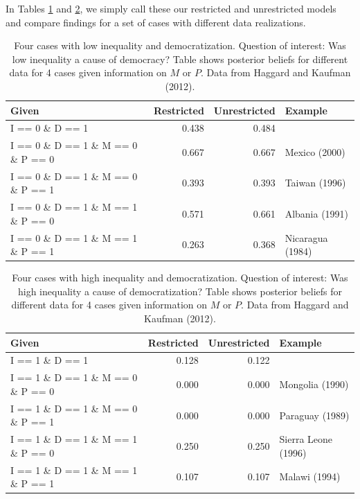 \documentclass[
  12pt,
]{book}
\begin{document}
In Tables \ref{tab:HK8cases1quant} and \ref{tab:HK8cases2quant}, we simply call these our restricted and unrestricted models and compare findings for a set of cases with different data realizations.

\begin{table}

\caption{\label{tab:HK8cases1quant}Four cases with low inequality and  democratization. Question of interest: Was low inequality a cause of democracy? Table shows posterior beliefs for different data for 4 cases given information on $M$ or $P$. Data from Haggard and Kaufman (2012).}
\centering
\begin{tabular}[t]{l|r|r|l}
\hline
Given & Restricted & Unrestricted & Example\\
\hline
I == 0  \& D ==  1 & 0.438 & 0.484 & \\
\hline
I == 0  \& D ==  1 \& M == 0 \& P == 0 & 0.667 & 0.667 & Mexico (2000)\\
\hline
I == 0  \& D ==  1 \& M == 0 \& P == 1 & 0.393 & 0.393 & Taiwan (1996)\\
\hline
I == 0  \& D ==  1 \& M == 1 \& P == 0 & 0.571 & 0.661 & Albania (1991)\\
\hline
I == 0  \& D ==  1 \& M == 1 \& P == 1 & 0.263 & 0.368 & Nicaragua (1984)\\
\hline
\end{tabular}
\end{table}

\begin{table}

\caption{\label{tab:HK8cases2quant}Four cases with high inequality and  democratization. Question of interest: Was high inequality a cause of democratization? Table shows posterior beliefs for different data for 4 cases given information on $M$ or $P$. Data from Haggard and Kaufman (2012).}
\centering
\begin{tabular}[t]{l|r|r|l}
\hline
Given & Restricted & Unrestricted & Example\\
\hline
I == 1  \& D ==  1 & 0.128 & 0.122 & \\
\hline
I == 1  \& D ==  1 \& M == 0 \& P == 0 & 0.000 & 0.000 & Mongolia (1990)\\
\hline
I == 1  \& D ==  1 \& M == 0 \& P == 1 & 0.000 & 0.000 & Paraguay (1989)\\
\hline
I == 1  \& D ==  1 \& M == 1 \& P == 0 & 0.250 & 0.250 & Sierra Leone (1996)\\
\hline
I == 1  \& D ==  1 \& M == 1 \& P == 1 & 0.107 & 0.107 & Malawi (1994)\\
\hline
\end{tabular}
\end{table}
\end{document}
